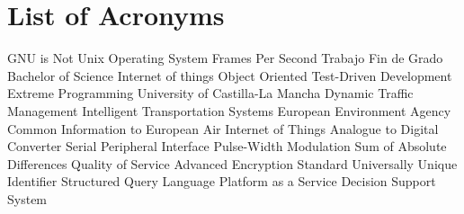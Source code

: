 \chapter{List of Acronyms} %

{\small
\begin{acronym}[XXXXXXXX]
	     	{\acs{GNU} is Not Unix}
			{Operating System}
			{Frames Per Second}
			{Trabajo Fin de Grado}
			{Bachelor of Science}
			{Internet of things}
			{Object Oriented}
			{Test-Driven Development}
			{Extreme Programming}
			{University of Castilla-La Mancha}
			{Dynamic Traffic Management}
			{Intelligent Transportation Systems}
			{European Environment Agency}
		{Common Information to European Air}
	 		{Internet of Things}
			{Analogue to Digital Converter}
			{Serial Peripheral Interface}
			{Pulse-Width Modulation}
			{Sum of Absolute Differences}
			{Quality of Service}
			{Advanced Encryption Standard}
			{Universally Unique Identifier}
			{Structured Query Language}
			{Platform as a Service}
			{Decision Support System}
\end{acronym}
}




